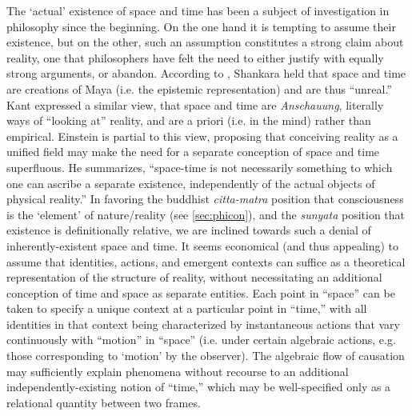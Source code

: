 \documentclass[pra,twocolumn,groupedaddress,10pt]{revtex4}
\theoremstyle{definition}
\begin{document}
The `actual' existence of space and time has been a subject of investigation in philosophy since the beginning. On the one hand it is tempting to assume their existence, but on the other, such an assumption constitutes a strong claim about reality, one that philosophers have felt the need to either justify with equally strong arguments, or abandon. According to \cite{waite}, Shankara held that space and time are creations of Maya (i.e. the epistemic representation) and are thus ``unreal.'' Kant expressed a similar view, that space and time are \emph{Anschauung}, literally ways of ``looking at'' reality\cite{russell}, and are a priori (i.e. in the mind) rather than empirical. Einstein is partial to this view, proposing that conceiving reality as a unified field may make the need for a separate conception of space and time superfluous. He summarizes, ``space-time is not necessarily something to which one can ascribe a separate existence, independently of the actual objects of physical reality.''\cite{einstein} In favoring the buddhist \emph{citta-matra} position that consciousness is the `element' of nature/reality (see \autoref{sec:phicon}), and the \emph{sunyata} position that existence is definitionally relative, we are inclined towards such a denial of inherently-existent space and time. It seems economical (and thus appealing) to assume that identities, actions, and emergent contexts can suffice as a theoretical representation of the structure of reality, without necessitating an additional conception of time and space as separate entities. Each point in ``space'' can be taken to specify a unique context at a particular point in ``time,'' with all identities in that context being characterized by instantaneous actions that vary continuously with ``motion'' in ``space'' (i.e. under certain algebraic actions, e.g. those corresponding to `motion' by the observer). The algebraic flow of causation may sufficiently explain phenomena without recourse to an additional independently-existing notion of ``time,'' which may be well-specified only as a relational quantity between two frames.
\end{document}
